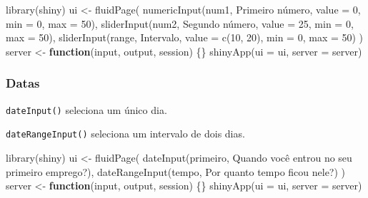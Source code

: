 \documentclass[
]{book}
\newenvironment{Shaded}{\begin{snugshade}}{\end{snugshade}}
\newcommand{\AttributeTok}[1]{\textcolor[rgb]{0.77,0.63,0.00}{#1}}
\newcommand{\ControlFlowTok}[1]{\textcolor[rgb]{0.13,0.29,0.53}{\textbf{#1}}}
\newcommand{\DecValTok}[1]{\textcolor[rgb]{0.00,0.00,0.81}{#1}}
\newcommand{\FunctionTok}[1]{\textcolor[rgb]{0.00,0.00,0.00}{#1}}
\newcommand{\NormalTok}[1]{#1}
\newcommand{\OtherTok}[1]{\textcolor[rgb]{0.56,0.35,0.01}{#1}}
\newcommand{\StringTok}[1]{\textcolor[rgb]{0.31,0.60,0.02}{#1}}
\begin{document}
\begin{Shaded}
\begin{Highlighting}[]
\FunctionTok{library}\NormalTok{(shiny)}
\NormalTok{ui }\OtherTok{\textless{}{-}} \FunctionTok{fluidPage}\NormalTok{(}
  \FunctionTok{numericInput}\NormalTok{(}\StringTok{\textquotesingle{}num1\textquotesingle{}}\NormalTok{, }\StringTok{\textquotesingle{}Primeiro número\textquotesingle{}}\NormalTok{, }\AttributeTok{value =} \DecValTok{0}\NormalTok{, }\AttributeTok{min =} \DecValTok{0}\NormalTok{, }\AttributeTok{max =} \DecValTok{50}\NormalTok{),}
  \FunctionTok{sliderInput}\NormalTok{(}\StringTok{\textquotesingle{}num2\textquotesingle{}}\NormalTok{, }\StringTok{\textquotesingle{}Segundo número\textquotesingle{}}\NormalTok{, }\AttributeTok{value =} \DecValTok{25}\NormalTok{, }\AttributeTok{min =} \DecValTok{0}\NormalTok{, }\AttributeTok{max =} \DecValTok{50}\NormalTok{),}
  \FunctionTok{sliderInput}\NormalTok{(}\StringTok{\textquotesingle{}range\textquotesingle{}}\NormalTok{, }\StringTok{\textquotesingle{}Intervalo\textquotesingle{}}\NormalTok{, }\AttributeTok{value =} \FunctionTok{c}\NormalTok{(}\DecValTok{10}\NormalTok{, }\DecValTok{20}\NormalTok{), }\AttributeTok{min =} \DecValTok{0}\NormalTok{, }\AttributeTok{max =} \DecValTok{50}\NormalTok{)}
\NormalTok{)}
\NormalTok{server }\OtherTok{\textless{}{-}} \ControlFlowTok{function}\NormalTok{(input, output, session) \{\}}
\FunctionTok{shinyApp}\NormalTok{(}\AttributeTok{ui =}\NormalTok{ ui, }\AttributeTok{server =}\NormalTok{ server)}
\end{Highlighting}
\end{Shaded}

\hypertarget{datas}{%
\subsubsection{\texorpdfstring{\textbf{Datas}}{Datas}}\label{datas}}

\texttt{dateInput()} seleciona um único dia.

\texttt{dateRangeInput()} seleciona um intervalo de dois dias.

\begin{Shaded}
\begin{Highlighting}[]
\FunctionTok{library}\NormalTok{(shiny)}
\NormalTok{ui }\OtherTok{\textless{}{-}} \FunctionTok{fluidPage}\NormalTok{(}
  \FunctionTok{dateInput}\NormalTok{(}\StringTok{\textquotesingle{}primeiro\textquotesingle{}}\NormalTok{, }\StringTok{\textquotesingle{}Quando você entrou no seu primeiro emprego?\textquotesingle{}}\NormalTok{),}
  \FunctionTok{dateRangeInput}\NormalTok{(}\StringTok{\textquotesingle{}tempo\textquotesingle{}}\NormalTok{, }\StringTok{\textquotesingle{}Por quanto tempo ficou nele?\textquotesingle{}}\NormalTok{)}
\NormalTok{)}
\NormalTok{server }\OtherTok{\textless{}{-}} \ControlFlowTok{function}\NormalTok{(input, output, session) \{\}}
\FunctionTok{shinyApp}\NormalTok{(}\AttributeTok{ui =}\NormalTok{ ui, }\AttributeTok{server =}\NormalTok{ server)}
\end{Highlighting}
\end{Shaded}
\end{document}
